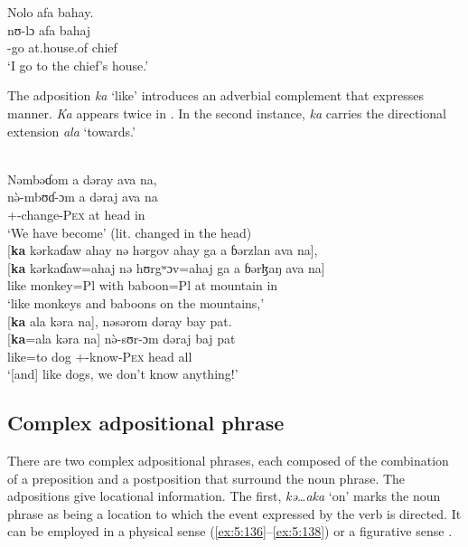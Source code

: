 \ea \label{ex:5:134}
Nolo  afa  bahay.\\
\gll  nʊ{}-lɔ   afa    bahaj\\
      {\oneS}-go  {at.house.of}  chief\\
\glt  ‘I go to the chief’s house.’
\z

The adposition \textit{ka} ‘like’ introduces an adverbial complement that expresses manner. \textit{Ka} appears twice in . In the second instance, \textit{ka} carries the directional extension \textit{ala} ‘towards.’

\clearpage
\ea \label{ex:5:135}\\
Nəmbəɗom  a  dəray  ava  na,   \\
\gll  n\`{ə}-mbʊɗ{}-ɔm    a  dəraj  ava  na\\
      {\oneS}+{\PFV}-change-\textsc{Pex}  at   head  in    {\PSP}\\
\glt ‘We have become’ (lit. changed in the head)\\
\medskip
{}[\textbf{ka} kərkaɗaw  ahay  nə  hərgov  ahay  ga  a  ɓərzlan  ava  na], \\
\gll  {}[\textbf{ka} kərkaɗaw=ahaj nə hʊrgʷɔv=ahaj ga a ɓərɮaŋ ava na]\\
      like  monkey=Pl  with    baboon=Pl  {\ADJ}  at  mountain    in    {\PSP}\\
\glt ‘like monkeys and baboons on the mountains,’ \\     
\medskip
{}[\textbf{ka}  ala  kəra    na],  nəsərom  dəray  bay  pat.\\
\gll  {}[\textbf{ka}=ala kəra na]  n\`{ə}-sʊr-ɔm dəraj baj pat\\
      like=to  dog      {\PSP}  +{\PFV}-know-\textsc{Pex}  head  {\NEG}  all\\
\glt  ‘[and] like dogs, we don’t know anything!’
\z

\subsection{Complex adpositional phrase}\label{sec:5.6.2}
\hypertarget{RefHeading1211861525720847}{}
There are two complex adpositional phrases, each composed of the combination of a preposition and a postposition that surround the noun phrase. The adpositions give locational information. The first, \textit{kə…aka} ‘on’ marks the noun phrase as being a location to which the event expressed by the verb is directed. It can be employed in a physical sense (\ref{ex:5:136}--\ref{ex:5:138}) or a figurative sense .  



